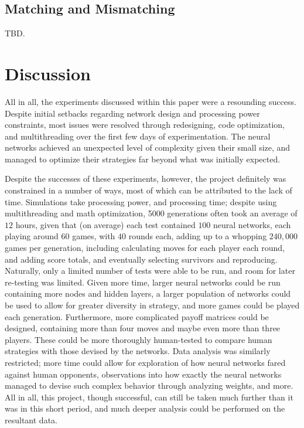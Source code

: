 \documentclass{article}
\begin{document}
\subsection{Matching and Mismatching}

TBD.

\section{Discussion}

All in all, the experiments discussed within this paper were a resounding success. Despite initial setbacks regarding network design and processing power constraints, most issues were resolved through redesigning, code optimization, and multithreading over the first few days of experimentation. The neural networks achieved an unexpected level of complexity given their small size, and managed to optimize their strategies far beyond what was initially expected.

Despite the successes of these experiments, however, the project definitely was constrained in a number of ways, most of which can be attributed to the lack of time. Simulations take processing power, and processing time; despite using multithreading and math optimization, 5000 generations often took an average of $12$ hours, given that (on average) each test contained $100$ neural networks, each playing around $60$ games, with $40$ rounds each, adding up to a whopping $240,000$ games per generation, including calculating moves for each player each round, and adding score totals, and eventually selecting survivors and reproducing. Naturally, only a limited number of tests were able to be run, and room for later re-testing was limited. Given more time, larger neural networks could be run containing more nodes and hidden layers, a larger population of networks could be used to allow for greater diversity in strategy, and more games could be played each generation. Furthermore, more complicated payoff matrices could be designed, containing more than four moves and maybe even more than three players. These could be more thoroughly human-tested to compare human strategies with those devised by the networks. Data analysis was similarly restricted; more time could allow for exploration of how neural networks fared against human opponents, observations into how exactly the neural networks managed to devise such complex behavior through analyzing weights, and more. All in all, this project, though successful, can still be taken much further than it was in this short period, and much deeper analysis could be performed on the resultant data.
\end{document}
